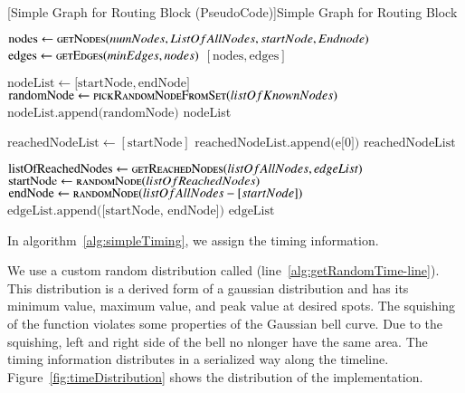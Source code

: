 \begin{breakablealgorithm}
	[Simple Graph for Routing Block (PseudoCode)]{Simple Graph for Routing Block}\label{alg:simpleGraph}
	\begin{algorithmic}[1]
		\label{alg:getGraph-line}
			\State $\text{nodes} \gets \Call{getNodes}{numNodes, ListOfAllNodes, startNode, Endnode}$
			\State $\text{edges} \gets \Call{getEdges}{minEdges,nodes}$
			\Return $[\text{nodes}, \text{edges}]$	
		\EndFunction
		\item[]		
		\label{alg:getNodes-line}
		  \State $\text{nodeList} \gets \lbrack\text{startNode}, \text{endNode}\rbrack$
		  	\State $\text{randomNode} \gets \Call{pickRandomNodeFromSet}{listOfKnownNodes}$
		  		\State $\text{nodeList.append(randomNode)}$ 
		  	\EndIf	
		  \EndWhile{}	
		  \Return nodeList
		\EndFunction  
		\item[]
		\label{alg:nodesReached-line}
			\State $\text{reachedNodeList} \gets [\text{startNode}]$
					\State $\text{reachedNodeList.append(e[0])}$
				\EndIf
			\EndFor
			\Return $\text{reachedNodeList}$
		\EndFunction
		\item[]
		\label{alg:getEdges-line}
				\State $\text{listOfReachedNodes} \gets \Call{getReachedNodes}{listOfAllNodes,edgeList}$
				\State $\text{startNode} \gets \Call{randomNode}{listOfReachedNodes}$
				\State $\text{endNode} \gets \Call{randomNode}{listOfAllNodes-[startNode]}$
				\State $\text{edgeList.append([startNode, endNode])}$
			\EndWhile{}
			\Return $\text{edgeList}$
		\EndFunction
	\end{algorithmic}
\end{breakablealgorithm}

In algorithm~\ref{alg:simpleTiming}, we assign the timing information. 

We use a custom random distribution called  (line~\ref{alg:getRandomTime-line}). This distribution is a derived form of a gaussian distribution and has its minimum value, maximum value, and peak value at desired spots. The squishing of the function violates some properties of the Gaussian bell curve. Due to the squishing, left and right side of the bell no nlonger have the same area. The timing information distributes in a serialized way along the timeline. Figure~\ref{fig:timeDistribution} shows the distribution of the implementation.

